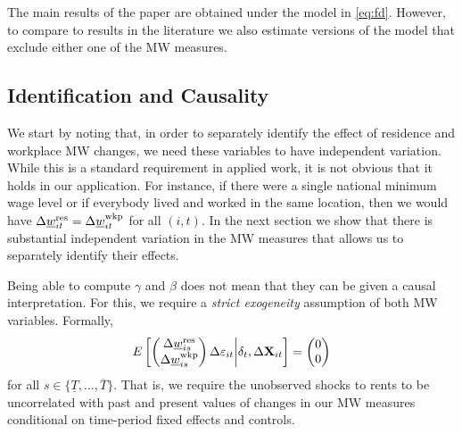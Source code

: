 The main results of the paper are obtained under the model in \eqref{eq:fd}. 
However, to compare to results in the literature we also estimate versions of 
the model that exclude either one of the MW measures.


\subsection{Identification and Causality}

We start by noting that, in order to separately identify the effect of 
residence and workplace MW changes, we need these variables to have independent
variation.
While this is a standard requirement in applied work, it is not obvious that it 
holds in our application.
For instance, if there were a single national minimum wage level or if everybody 
lived and worked in the same location, then we would have
$\Delta \underline{w}^{\text{res}}_{it} = \Delta \underline{w}^{\text{wkp}}_{it}$ for all $(i,t)$.
In the next section we show that there is substantial independent variation
in the MW measures that allows us to separately identify their effects.

Being able to compute $\gamma$ and $\beta$ does not mean that they can be given
a causal interpretation.
For this, we require a \textit{strict exogeneity} assumption of both MW 
variables. 
Formally,
\begin{equation}\label{eq:strict_exogeneity}
    E\left[
        \begin{pmatrix}
            \Delta \underline{w}^{\text{res}}_{is} \\
            \Delta \underline{w}^{\text{wkp}}_{is} \\
        \end{pmatrix}
        \Delta \varepsilon_{it}
    \bigg| \delta_t, \Delta \mathbf{X}_{it} \right] =
    \begin{pmatrix}
        0 \\
        0 \\
    \end{pmatrix}
\end{equation}
for all $s\in\{\underline{T}, ..., \overline{T}\}$.
That is, we require the unobserved shocks to rents to be uncorrelated with 
past and present values of changes in our MW measures conditional on time-period 
fixed effects and controls.

